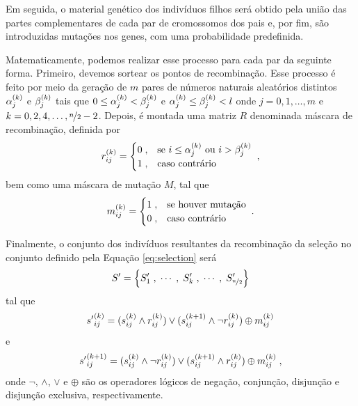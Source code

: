Em seguida, o material genético dos indivíduos filhos será obtido pela união das partes complementares
de cada par de cromossomos dos pais e, por fim, são introduzidas mutações nos genes, com uma probabilidade predefinida.



Matematicamente, podemos realizar esse processo para cada par da seguinte forma. Primeiro, devemos
sortear os pontos de recombinação. Esse processo é feito por meio da geração de $m$ pares
de números naturais aleatórios distintos $ {\alpha}^{(k)}_{j} $ e $ {\beta}^{(k)}_{j} $ tais que
$ 0 \leq {\alpha}^{(k)}_{j} < {\beta}^{(k)}_{j} $ e $ {\alpha}^{(k)}_{j} \leq {\beta}^{(k)}_{j} < l $ onde
$ j = 0, 1, \dots, m $ e $ k = 0, 2, 4, \dots, \nicefrac{n}{2} - 2 $.
Depois, é montada uma matriz $R$ denominada máscara de recombinação, definida por
\begin{equation}
  {r}^{(k)}_{ij} =
  \begin{cases}
    0 \;, & \text{se } i \leq {\alpha}^{(k)}_{j} \text{ ou } i > {\beta}^{(k)}_{j} \\
    1 \;, & \text{caso contrário}
  \end{cases}
  \;\mathrm{,}
\end{equation}
bem como uma máscara de mutação $M$, tal que
\begin{equation}
  {m}^{(k)}_{ij} =
  \begin{cases}
    1 \;, & \text{se houver mutação} \\
    0 \;, & \text{caso contrário}
  \end{cases}
  \;\mathrm{.}
\end{equation}

Finalmente, o conjunto dos indivíduos resultantes da recombinação da seleção no conjunto definido
pela Equação \ref{eq:selection} será
\begin{equation}
  S' = \left\{ S'_1\;, \;\cdots\;,  \;S'_k\;, \;\cdots\;, \;S'_{\nicefrac{n}{2}} \right\}
\end{equation}
tal que
\begin{equation}
  {s'}^{(k)}_{ij} = ({s}^{(k)}_{ij} \land {r}^{(k)}_{ij}) \lor ({s}^{(k + 1)}_{ij} \land \lnot {r}^{(k)}_{ij}) \oplus {m}^{(k)}_{ij}
\end{equation}
e
\begin{equation}
  {s'}^{(k + 1)}_{ij} = ({s}^{(k)}_{ij} \land \lnot {r}^{(k)}_{ij}) \lor ({s}^{(k + 1)}_{ij} \land {r}^{(k)}_{ij}) \oplus {m}^{(k)}_{ij} \;\mathrm{,}
\end{equation}
onde $\lnot$, $\land$, $\lor$ e $\oplus$ são os operadores lógicos de negação, conjunção, disjunção e disjunção exclusiva,
respectivamente.

